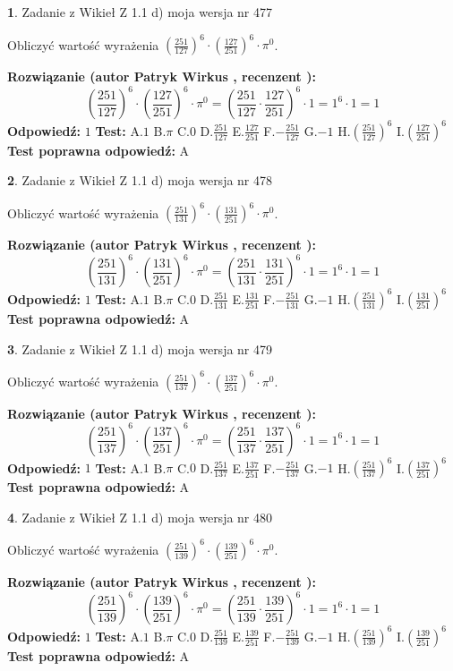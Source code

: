 \documentclass[12pt, a4paper]{article}
\theoremstyle{definition} %
\newtheorem{zad}{}
\newcommand{\zadStart}[1]{\begin{zad}#1\newline}
\newcommand{\zadStop}{\end{zad}}
\newcommand{\rozwStart}[2]{\noindent \textbf{Rozwiązanie (autor #1 , recenzent #2): }\newline}
\newcommand{\rozwStop}{\newline}
\newcommand{\odpStart}{\noindent \textbf{Odpowiedź:}\newline}
\newcommand{\odpStop}{\newline}
\newcommand{\testStart}{\noindent \textbf{Test:}\newline}
\newcommand{\testStop}{\newline}
\newcommand{\kluczStart}{\noindent \textbf{Test poprawna odpowiedź:}\newline}
\newcommand{\kluczStop}{\newline}
\begin{document}
\zadStart{Zadanie z Wikieł Z 1.1 d) moja wersja nr 477}

Obliczyć wartość wyrażenia $(\frac{251}{127})^{6} \cdot (\frac{127}{251})^{6} \cdot \pi^{0}$.
\zadStop
\rozwStart{Patryk Wirkus}{}
$$(\frac{251}{127})^{6} \cdot (\frac{127}{251})^{6} \cdot \pi^{0} = (\frac{251}{127} \cdot \frac{127}{251})^{6} \cdot 1 = 1^{6} \cdot 1 = 1$$
\rozwStop
\odpStart
$1$
\odpStop
\testStart
A.$1$ B.$\pi$ C.$0$ D.$\frac{251}{127}$ E.$\frac{127}{251}$
F.$-\frac{251}{127}$ G.$-1$
H.$(\frac{251}{127})^{6}$
I.$(\frac{127}{251})^{6}$
\testStop
\kluczStart
A
\kluczStop



\zadStart{Zadanie z Wikieł Z 1.1 d) moja wersja nr 478}

Obliczyć wartość wyrażenia $(\frac{251}{131})^{6} \cdot (\frac{131}{251})^{6} \cdot \pi^{0}$.
\zadStop
\rozwStart{Patryk Wirkus}{}
$$(\frac{251}{131})^{6} \cdot (\frac{131}{251})^{6} \cdot \pi^{0} = (\frac{251}{131} \cdot \frac{131}{251})^{6} \cdot 1 = 1^{6} \cdot 1 = 1$$
\rozwStop
\odpStart
$1$
\odpStop
\testStart
A.$1$ B.$\pi$ C.$0$ D.$\frac{251}{131}$ E.$\frac{131}{251}$
F.$-\frac{251}{131}$ G.$-1$
H.$(\frac{251}{131})^{6}$
I.$(\frac{131}{251})^{6}$
\testStop
\kluczStart
A
\kluczStop



\zadStart{Zadanie z Wikieł Z 1.1 d) moja wersja nr 479}

Obliczyć wartość wyrażenia $(\frac{251}{137})^{6} \cdot (\frac{137}{251})^{6} \cdot \pi^{0}$.
\zadStop
\rozwStart{Patryk Wirkus}{}
$$(\frac{251}{137})^{6} \cdot (\frac{137}{251})^{6} \cdot \pi^{0} = (\frac{251}{137} \cdot \frac{137}{251})^{6} \cdot 1 = 1^{6} \cdot 1 = 1$$
\rozwStop
\odpStart
$1$
\odpStop
\testStart
A.$1$ B.$\pi$ C.$0$ D.$\frac{251}{137}$ E.$\frac{137}{251}$
F.$-\frac{251}{137}$ G.$-1$
H.$(\frac{251}{137})^{6}$
I.$(\frac{137}{251})^{6}$
\testStop
\kluczStart
A
\kluczStop



\zadStart{Zadanie z Wikieł Z 1.1 d) moja wersja nr 480}

Obliczyć wartość wyrażenia $(\frac{251}{139})^{6} \cdot (\frac{139}{251})^{6} \cdot \pi^{0}$.
\zadStop
\rozwStart{Patryk Wirkus}{}
$$(\frac{251}{139})^{6} \cdot (\frac{139}{251})^{6} \cdot \pi^{0} = (\frac{251}{139} \cdot \frac{139}{251})^{6} \cdot 1 = 1^{6} \cdot 1 = 1$$
\rozwStop
\odpStart
$1$
\odpStop
\testStart
A.$1$ B.$\pi$ C.$0$ D.$\frac{251}{139}$ E.$\frac{139}{251}$
F.$-\frac{251}{139}$ G.$-1$
H.$(\frac{251}{139})^{6}$
I.$(\frac{139}{251})^{6}$
\testStop
\kluczStart
A
\kluczStop
\end{document}
